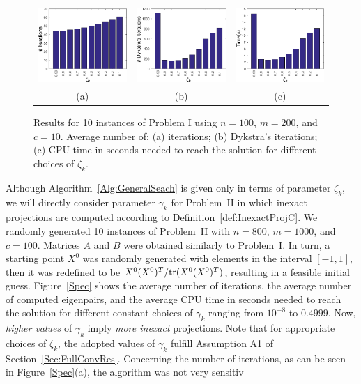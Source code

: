 \begin{figure}[H]\centering
	\begin{tabular}{ccc}
		\includegraphics[scale=\myscale]{figures/SDDit} & \includegraphics[scale=\myscale]{figures/SDDDIT} & \includegraphics[scale=\myscale]{figures/SDDtime}\\
		(a) & (b) & (c)\\
	\end{tabular}
	\caption[Results for 10 instances of Problem I]{Results for 10 instances of Problem I using $n=100$, $m=200$, and $c=10$. Average number of: (a) iterations; (b) Dykstra’s iterations; (c)  CPU time in seconds needed to reach the solution for different choices of $\zeta_k$.}
	\label{SDD}
\end{figure}

Although Algorithm~\ref{Alg:GeneralSeach} is given only in terms of parameter $\zeta_k$, we will directly consider parameter $\gamma_k$ for Problem~II in which inexact projections are computed according to Definition~\ref{def:InexactProjC}. We randomly generated 10 instances of Problem~II with $n=800$, $m=1000$, and $c=100$. Matrices $A$ and $B$ were obtained similarly to Problem~I. In turn, a starting point $X^0$ was randomly generated with elements in the interval $[-1,1]$, then it was redefined to be $X^0  (X^0)^T/\textrm{tr}(X^0  (X^0)^T)$, resulting in a feasible initial guess.
Figure~\ref{Spec} shows the average number of iterations,  the average number of computed eigenpairs, and the average  CPU time in seconds needed to reach the solution for different constant choices of $\gamma_k$ ranging from $10^{-8}$ to $0.4999$. Now, {\it higher values} of $\gamma_k$ imply {\it more inexact} projections. Note that for appropriate choices of $\zeta_k$, the adopted values of $\gamma_k$ fulfill Assumption A1 of Section~\ref{Sec:FullConvRes}. Concerning the number of iterations, as can be seen in Figure~\ref{Spec}(a),  the algorithm was not very sensitiv